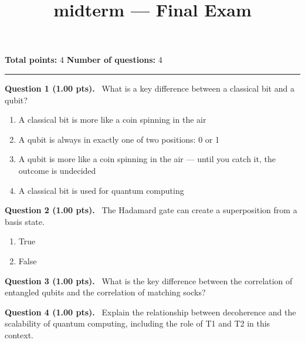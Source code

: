 \documentclass[12pt,a4paper]{article}
\title{midterm --- Final Exam}
\date{}
\begin{document}
\maketitle



\noindent
\textbf{Total points:} 4
\hfill
\textbf{Number of questions:} 4

\vspace{1em}
\hrule
\vspace{1.5em}


\noindent
\textbf{Question 1 (1.00 pts).}~
What is a key difference between a classical bit and a qubit?


\begin{enumerate}[label=\textbf{\Alph*.}]

  \item A classical bit is more like a coin spinning in the air

  \item A qubit is always in exactly one of two positions: 0 or 1

  \item A qubit is more like a coin spinning in the air --- until you catch it, the outcome is undecided

  \item A classical bit is used for quantum computing

\end{enumerate}



\vspace{0.5em}


\noindent
\textbf{Question 2 (1.00 pts).}~
The Hadamard gate can create a superposition from a basis state.


\begin{enumerate}[label=\textbf{\Alph*.}]
  \item True
  \item False
\end{enumerate}



\vspace{0.5em}


\noindent
\textbf{Question 3 (1.00 pts).}~
What is the key difference between the correlation of entangled qubits and the correlation of matching socks?


\vspace{0.4cm}
\noindent\makebox[\linewidth]{\hrulefill}
\vspace{0.6cm}



\vspace{0.5em}


\noindent
\textbf{Question 4 (1.00 pts).}~
Explain the relationship between decoherence and the scalability of quantum computing, including the role of T1 and T2 in this context.


\vspace{0.4cm}
\noindent\makebox[\linewidth]{\hrulefill}
\vspace{0.4cm}
\noindent\makebox[\linewidth]{\hrulefill}
\vspace{0.4cm}
\noindent\makebox[\linewidth]{\hrulefill}
\vspace{0.6cm}
\end{document}
